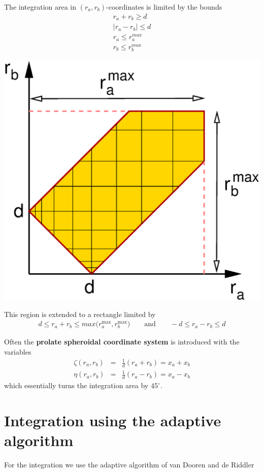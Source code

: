\documentclass[11pt,a4paper]{report}
\begin{document}
The integration area in $(r_a,r_b)$-coordinates is limited by the
bounds
\begin{eqnarray*}
r_a+r_b\ge d
\\
|r_a-r_b|\le d
\\
r_a\le r_a^{max}
\\
r_b\le r_b^{max}
\end{eqnarray*}

\begin{center}
\includegraphics[width=0.5\linewidth]{Figs/Twocenterintegral/tcenter.eps}
\end{center}

This region is extended to a rectangle limited by
\begin{eqnarray*}
d\le r_a+r_b\le  max\biggl(r_a^{\text{max}},r_b^{\text{max}}\biggr)
\qquad\text{and}\qquad
-d\le r_a-r_b\le d
\end{eqnarray*}



Often the \textbf{prolate spheroidal coordinate system}  is introduced with the variables
\begin{eqnarray*}
\zeta(r_a,r_b)&=&\frac{1}{d}(r_a+r_b)=x_a+x_b
\\
\eta(r_a,r_b)&=&\frac{1}{d}(r_a-r_b)=x_a-x_b
\end{eqnarray*}
which essentially turns the integration area by $45^\circ$.


\section{Integration using the adaptive algorithm}
\label{app:adaptiveintegration}
For the integration we use the adaptive algorithm of van Dooren and de
Riddler\cite{vandooren76_jcomputapplmath2_207,
  genz80_jcomputapplmath6_295}
\end{document}
